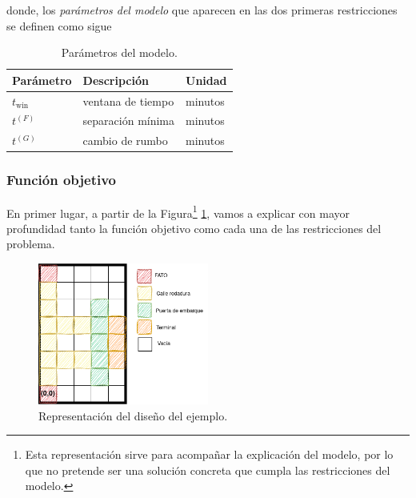 \documentclass[12pt,a4paper]{book}
\begin{document}

donde, los \textsl{parámetros del modelo} que aparecen  en las dos primeras restricciones se definen como sigue

\begin{table}[h]
\centering
\begin{tabular}{|l|l|l|}
\hline
\textbf{Parámetro} & \textbf{Descripción} & \textbf{Unidad} \\ \hline
$t_{\text{win}}$   & ventana de tiempo    & minutos         \\ 
$t^{(F)}$   & separación mínima    & minutos         \\ 
$t^{(G)}$   & cambio de rumbo      & minutos         \\ \hline
\end{tabular}
\caption{Parámetros del modelo.}
\label{tab: cte_1}
\end{table}

\subsubsection{Función objetivo}
En primer lugar, a partir de la Figura\footnote{Esta representación sirve para acompañar la explicación del modelo, por lo que no pretende ser una solución concreta que cumpla las restricciones del modelo.} \ref{fig:ej_rest}, vamos a explicar con mayor profundidad tanto la función objetivo como cada una de las restricciones del problema.

\begin{figure}[h]
    \begin{center}
    \includegraphics[width=0.5\textwidth]{img/ej_formulas.png}
    \end{center}
    \caption{Representación del diseño del ejemplo.}
    \label{fig:ej_rest}
\end{figure} 
\end{document}

